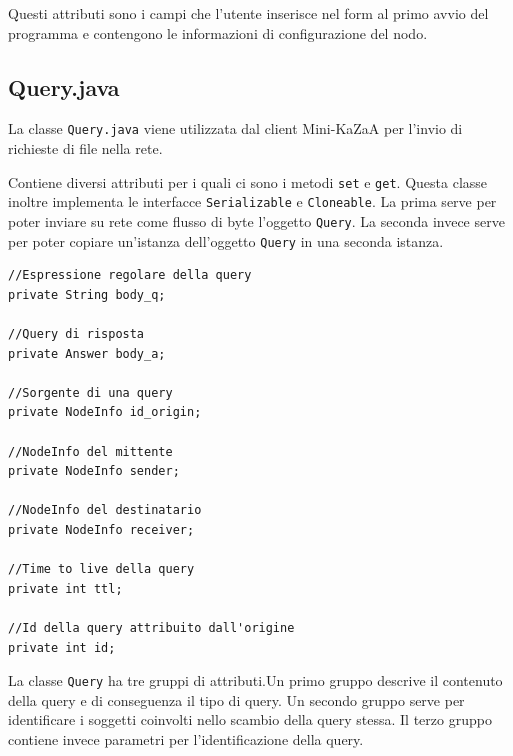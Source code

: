 Questi attributi sono i campi che l'utente inserisce nel form al primo avvio del programma e contengono le informazioni di configurazione del nodo. 

\subsection{Query.java}\label{sec:query}
La classe \verb|Query.java| viene utilizzata dal client Mini-KaZaA per l'invio di richieste di file nella rete.

Contiene diversi attributi per i quali ci sono i metodi \verb|set| e \verb|get|. Questa classe inoltre implementa
le interfacce \verb|Serializable| e \verb|Cloneable|.
La prima serve per poter inviare su rete come flusso di byte l'oggetto \verb|Query|. La seconda invece serve per poter
copiare un'istanza dell'oggetto \verb|Query| in una seconda istanza.
\newline
\begin{lstlisting}
//Espressione regolare della query
private String body_q;

//Query di risposta
private Answer body_a;

//Sorgente di una query
private NodeInfo id_origin;

//NodeInfo del mittente
private NodeInfo sender;

//NodeInfo del destinatario
private NodeInfo receiver;

//Time to live della query
private int ttl;

//Id della query attribuito dall'origine
private int id;
\end{lstlisting}

La classe \verb|Query| ha tre gruppi di attributi.Un primo gruppo descrive il contenuto della query e di conseguenza
il tipo di query. Un secondo gruppo serve per identificare i soggetti coinvolti nello scambio della query stessa.
Il terzo gruppo contiene invece parametri per l'identificazione della query. 

